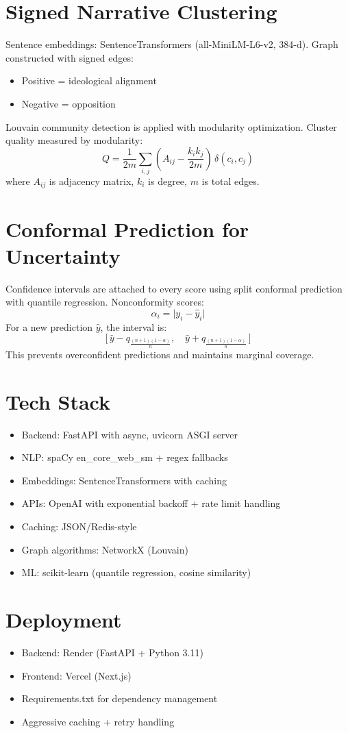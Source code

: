 \documentclass[12pt]{article}
\begin{document}
\section*{Signed Narrative Clustering}
Sentence embeddings: SentenceTransformers (all-MiniLM-L6-v2, 384-d). Graph constructed with signed edges:
\begin{itemize}
  \item Positive = ideological alignment
  \item Negative = opposition
\end{itemize}
Louvain community detection is applied with modularity optimization. Cluster quality measured by modularity:
\[
Q = \frac{1}{2m} \sum_{i,j} \left(A_{ij} - \frac{k_i k_j}{2m}\right)\,\delta(c_i, c_j)
\]
where $A_{ij}$ is adjacency matrix, $k_i$ is degree, $m$ is total edges.

\section*{Conformal Prediction for Uncertainty}
Confidence intervals are attached to every score using split conformal prediction with quantile regression. Nonconformity scores:
\[
\alpha_i = \lvert y_i - \hat{y}_i \rvert
\]
For a new prediction $\hat{y}$, the interval is:
\[
\Big[\, \hat{y} - q_{\tfrac{(n+1)(1-\alpha)}{n}}, \quad \hat{y} + q_{\tfrac{(n+1)(1-\alpha)}{n}} \,\Big]
\]
This prevents overconfident predictions and maintains marginal coverage.

\section*{Tech Stack}
\begin{itemize}
  \item Backend: FastAPI with async, uvicorn ASGI server
  \item NLP: spaCy en\_core\_web\_sm + regex fallbacks
  \item Embeddings: SentenceTransformers with caching
  \item APIs: OpenAI with exponential backoff + rate limit handling
  \item Caching: JSON/Redis-style
  \item Graph algorithms: NetworkX (Louvain)
  \item ML: scikit-learn (quantile regression, cosine similarity)
\end{itemize}

\section*{Deployment}
\begin{itemize}
  \item Backend: Render (FastAPI + Python 3.11)
  \item Frontend: Vercel (Next.js)
  \item Requirements.txt for dependency management
  \item Aggressive caching + retry handling
\end{itemize}
\end{document}

